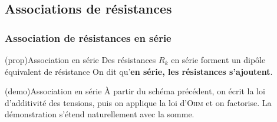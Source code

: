 \documentclass[../../main/main.tex]{subfiles}
\begin{document}
\vspace{-10pt}
\subsection{Associations de résistances}
\subsubsection{Association de résistances en série}
\begin{tcb*}[label=prop:rserie, sidebyside, righthand ratio=.4](prop){Association en série}
	Des résistances $R_k$ en série forment un dipôle équivalent de
	résistance
	\psw{%
		\[
			\boxed{R\ind{eq} = \sum_k R_k}
		\]
	}%
	On dit qu'\textbf{en série, les résistances s'ajoutent}.
	\tcblower
	\begin{center}
	\end{center}
\end{tcb*}
\begin{tcb*}[label=demo:rserie, sidebyside, righthand ratio=.4](demo){Association en série}
	À partir du schéma précédent, on écrit la loi d'additivité des tensions,
	puis on applique la loi d'\textsc{Ohm} et on factorise.
	\smallbreak
	La démonstration s'étend naturellement avec la somme.
	\tcblower
\end{tcb*}
\end{document}
